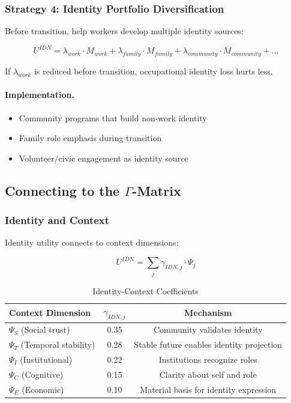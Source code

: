 \subsubsection{Strategy 4: Identity Portfolio Diversification}

Before transition, help workers develop multiple identity sources:

\begin{equation}
U^{IDN} = \lambda_{work} \cdot M_{work} + \lambda_{family} \cdot M_{family} + \lambda_{community} \cdot M_{community} + \ldots
\end{equation}

If $\lambda_{work}$ is reduced before transition, occupational identity 
loss hurts less.

\paragraph{Implementation.}
\begin{itemize}
    \item Community programs that build non-work identity
    \item Family role emphasis during transition
    \item Volunteer/civic engagement as identity source
\end{itemize}

\subsection{Connecting to the $\Gamma$-Matrix}

\subsubsection{Identity and Context}

Identity utility connects to context dimensions:

\begin{equation}
U^{IDN} = \sum_j \gamma_{IDN,j} \cdot \Psi_j
\end{equation}

\begin{table}[htbp]
\centering
\caption{Identity-Context Coefficients}
\label{tab:identity-context}
\begin{tabular}{@{}lcc@{}}
\toprule
\textbf{Context Dimension} & \textbf{$\gamma_{IDN,j}$} & \textbf{Mechanism} \\
\midrule
$\Psi_S$ (Social trust) & 0.35 & Community validates identity \\
$\Psi_T$ (Temporal stability) & 0.28 & Stable future enables identity projection \\
$\Psi_I$ (Institutional) & 0.22 & Institutions recognize roles \\
$\Psi_C$ (Cognitive) & 0.15 & Clarity about self and role \\
$\Psi_E$ (Economic) & 0.10 & Material basis for identity expression \\
\bottomrule
\end{tabular}
\end{table}

